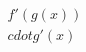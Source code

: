 \documentclass[preview]{standalone}
\begin{document}
\begin{align*}
f'(g(x)) \\cdot g'(x)
\end{align*}
\end{document}
